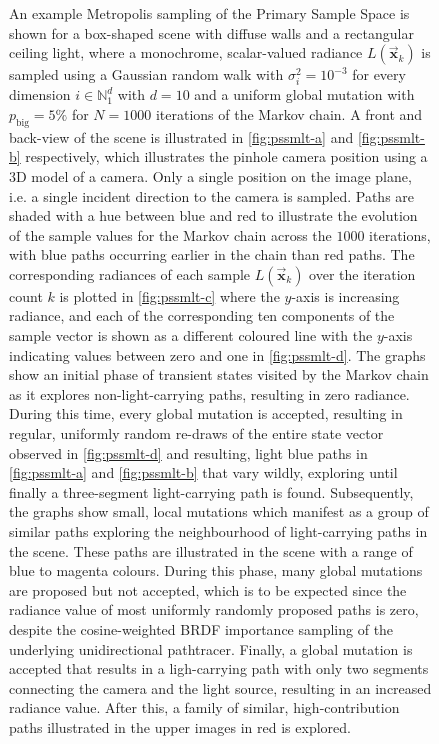 \documentclass[oneside, a4paper]{article}
\newcommand\vek[1]{\vec{\bm{#1}}}
\newcommand\br[1]{\left(#1\right)}
\begin{document}
\begin{figure}
  \caption{An example Metropolis sampling of the Primary Sample Space is shown for a box-shaped scene with diffuse walls and a rectangular ceiling light, where a monochrome, scalar-valued radiance $L\br{\vek{x}_k}$ is sampled using a Gaussian random walk with $\sigma_i^2=10^{-3}$ for every dimension $i\in\mathds{N}_1^d$ with $d=10$ and a uniform global mutation with $p_\text{big}=5\%$ for $N=1000$ iterations of the Markov chain. A front and back-view of the scene is illustrated in \autoref{fig:pssmlt-a} and \autoref{fig:pssmlt-b} respectively, which illustrates the pinhole camera position using a 3D model of a camera. Only a single position on the image plane, i.e. a single incident direction to the camera is sampled. Paths are shaded with a hue between blue and red to illustrate the evolution of the sample values for the Markov chain across the $1000$ iterations, with blue paths occurring earlier in the chain than red paths. The corresponding radiances of each sample $L\br{\vek{x}_k}$ over the iteration count $k$ is plotted in \autoref{fig:pssmlt-c} where the $y$-axis is increasing radiance, and each of the corresponding ten components of the sample vector is shown as a different coloured line with the $y$-axis indicating values between zero and one in \autoref{fig:pssmlt-d}. The graphs show an initial phase of transient states visited by the Markov chain as it explores non-light-carrying paths, resulting in zero radiance. During this time, every global mutation is accepted, resulting in regular, uniformly random re-draws of the entire state vector observed in \autoref{fig:pssmlt-d} and resulting, light blue paths in \autoref{fig:pssmlt-a} and \autoref{fig:pssmlt-b} that vary wildly, exploring until finally a three-segment light-carrying path is found. Subsequently, the graphs show small, local mutations which manifest as a group of similar paths exploring the neighbourhood of light-carrying paths in the scene. These paths are illustrated in the scene with a range of blue to magenta colours. During this phase, many global mutations are proposed but not accepted, which is to be expected since the radiance value of most uniformly randomly proposed paths is zero, despite the cosine-weighted BRDF importance sampling of the underlying unidirectional pathtracer. Finally, a global mutation is accepted that results in a ligh-carrying path with only two segments connecting the camera and the light source, resulting in an increased radiance value. After this, a family of similar, high-contribution paths illustrated in the upper images in red is explored.} 
  \label{fig:pssmlt-example}
\end{figure}
\end{document}
